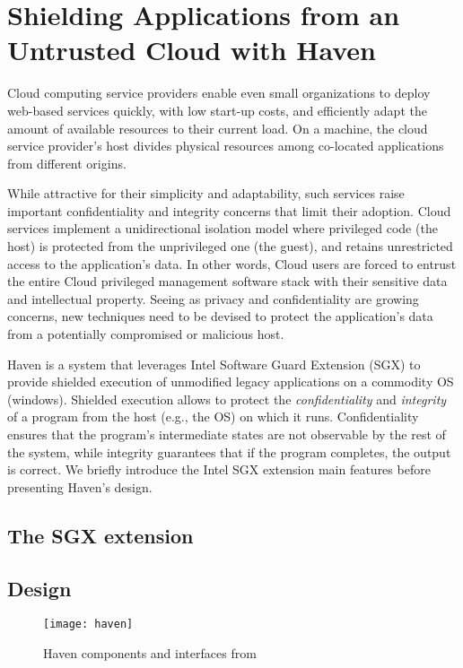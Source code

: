 \section{Shielding Applications from an Untrusted Cloud with Haven}

Cloud computing service providers enable even small organizations to deploy web-based services quickly, with low start-up costs, and efficiently adapt the amount of available resources to their current load.
On a machine, the cloud service provider's host divides physical resources among co-located applications from different origins.

While attractive for their simplicity and adaptability, such services raise important confidentiality and integrity concerns that limit their adoption\cite{mining,NSAYahoo}.
Cloud services implement a unidirectional isolation model where privileged code (the host) is protected from the unprivileged one (the guest), and retains unrestricted access to the application's data.
In other words, Cloud users are forced to entrust the entire Cloud privileged management software stack with their sensitive data and intellectual property.
Seeing as privacy and confidentiality are growing concerns, new techniques need to be devised to protect the application's data from a potentially compromised or malicious host.

Haven\cite{DBLP:journals/tocs/BaumannPH15} is a system that leverages Intel Software Guard Extension (SGX)\cite{SGXManual} to provide shielded execution of unmodified legacy applications on a commodity OS (windows).
Shielded execution allows to protect the \emph{confidentiality} and \emph{integrity} of a program from the host (e.g., the OS) on which it runs.
Confidentiality ensures that the program's intermediate states are not observable by the rest of the system, while integrity guarantees that if the program completes, the output is correct.
We briefly introduce the Intel SGX extension main features before presenting Haven's design.

\subsection{The SGX extension}



\subsection{Design}


\begin{figure*}
	\centering
  \texttt{[image: haven]}\label{fig:haven}
  \caption{Haven components and interfaces from \cite{DBLP:journals/tocs/BaumannPH15}}
\end{figure*}

